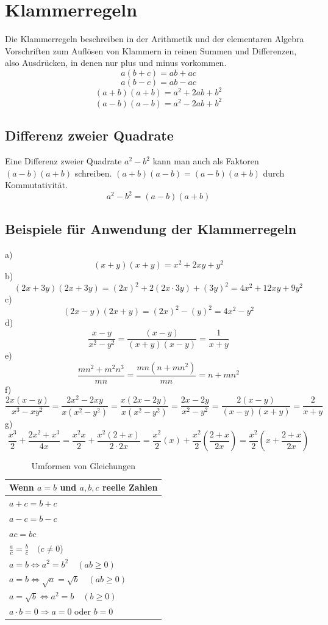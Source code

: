 \documentclass[a4paper]{article}
\begin{document}
\section{Klammerregeln}
Die Klammerregeln beschreiben in der Arithmetik und der elementaren Algebra Vorschriften zum Auflösen von Klammern in reinen Summen und Differenzen, also Ausdrücken, in denen nur plus und minus vorkommen. \\
\[a(b+c) = ab+ac\]
\[a(b-c) = ab-ac\]
\[(a+b)(a+b) = a^{2} + 2ab + b^{2}\]
\[(a-b)(a-b) = a^{2} - 2ab + b^{2}\]

\subsection{Differenz zweier Quadrate}
Eine Differenz zweier Quadrate $a^{2} - b^{2}$ kann man auch als Faktoren $(a-b)(a+b)$ schreiben. $(a+b)(a-b) = (a-b)(a+b)$ durch Kommutativität.
\[a^{2} - b^{2} = (a-b)(a+b)\]
\subsection{Beispiele für Anwendung der Klammerregeln}
a) \[(x+y)(x+y)=x^{2}+2xy+y^{2}\]
b) \[(2x+3y)(2x+3y)=(2x)^{2}+2(2x \cdot 3y) + (3y)^{2} = 4x^{2}+12xy+9y^{2} \]
c) \[(2x-y)(2x+y)=(2x)^{2}-(y)^{2} = 4x^{2}-y^{2} \]
d) \[\frac{x-y}{x^{2}-y^{2}} = \frac{(x-y)}{(x+y)(x-y)} = \frac{1}{x+y}\]
e) \[\frac{mn^{2} +m^{2}n^{3}}{mn} = \frac{mn(n+mn^{2})}{mn} = n+mn^{2}\]
f) \[\frac{2x(x-y)}{x^{3}-xy^{2}} = \frac{2x^{2}-2xy}{x(x^{2}-y^{2})} = \frac{x(2x-2y)}{x(x^{2}-y^{2})} = \frac{2x-2y}{x^{2}-y^{2}} = \frac{2(x-y)}{(x-y)(x+y)} = \frac{2}{x+y}\]
g) \[\frac{x^{3}}{2} + \frac{2x^{2}+x^{3}}{4x} = \frac{x^{2}x}{2} + \frac{x^{2}(2+x)}{2 \cdot 2x} = \frac{x^{2}}{2}(x) + \frac{x^{2}}{2} \left(\frac{2+x}{2x}\right) = \frac{x^{2}}{2} \left(x+\frac{2+x}{2x}\right) \]

\begin{table}[t]
\centering
\begin{tabular}{l} Wenn $a=b$ und $a,b,c$ reelle Zahlen\\ 
\hline
$a+c=b+c$ \\
$a-c=b-c$ \\
$ac=bc$ \\
$ \frac{a}{c} = \frac{b}{c} \quad (c \neq 0$) \\ \hline
$a=b \Leftrightarrow a^{2}=b^{2} \quad (ab \geq 0)$\\
$a=b \Leftrightarrow \sqrt{a}=\sqrt{b} \quad (ab \geq 0)$\\
$a=\sqrt{b} \Leftrightarrow a^{2} = b \quad (b \geq 0)$\\
$a \cdot b = 0 \Rightarrow a=0$ oder $b=0$ \\ 
\hline
\end{tabular}
\caption{\label{tab:Gleichungen}{Umformen von Gleichungen}}
\end{table}
\end{document}
